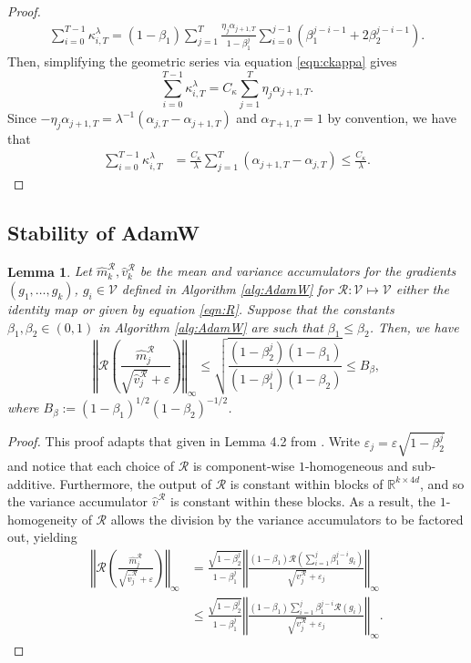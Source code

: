 \documentclass{article}
\newtheorem{lemma}[theorem]{Lemma}
\newcommand{\R}{\mathbb{R}}
\begin{document}
\begin{appendices}
\begin{proof}
\begin{align*}
    \sum_{i=0}^{T-1}\kappa^\lambda_{i,T}= (1-\beta_1)\sum_{j=1}^T\frac{\eta_{j}\alpha_{j+1,T}}{1-\beta_1^j}\sum_{i=0}^{j-1}(\beta_1^{j-i-1}+2\beta_2^{j-i-1}).
\end{align*}
Then, simplifying the geometric series via equation \eqref{eqn:ckappa} gives
\[
\sum_{i=0}^{T-1}\kappa^\lambda_{i,T} = C_\kappa  \sum_{j=1}^T \eta_j\alpha_{j+1,T}.
\]
Since $-\eta_j\alpha_{j+1,T} =\lambda^{-1}(\alpha_{j,T}-\alpha_{j+1,T})$ and $\alpha_{T+1,T}=1$ by convention, we have that
\begin{align*}
    \sum_{i=0}^{T-1}\kappa^\lambda_{i,T}
    & = \frac{C_\kappa}{\lambda}\sum_{j=1}^T (\alpha_{j+1,T}-\alpha_{j,T})\le \frac{C_\kappa}{\lambda}.
\end{align*}
\end{proof}
\subsection{Stability of AdamW}\label{App:K2}
\begin{lemma}\label{lemma:BoundDelta}
Let $\hat m^\mathcal R_k, \hat v^\mathcal R_k$ be the mean and variance accumulators for the gradients $(g_1,\ldots,g_k)$, $g_i \in \mathscr{V}$ defined in Algorithm \ref{alg:AdamW} for $\mathcal R:\mathscr{V}\mapsto \mathscr{V}$ either the identity map or given by equation \eqref{eqn:R}. Suppose that the constants $\beta_1,\beta_2\in (0,1)$ in Algorithm \ref{alg:AdamW} are such that $\beta_1\le \beta_2$. Then, we have
\[
\left\Vert \mathcal R \left(\frac{\hat m^{\mathcal R}_j}{\sqrt{\hat v^{\mathcal R}_j}+\varepsilon} \right)\right\Vert_\infty \le \sqrt{\frac{(1-\beta_2^j)(1-\beta_1)}{(1-\beta_1^j)(1-\beta_2)}}\le B_\beta,
\]  
where $B_\beta:=(1-\beta_1)^{1/2}(1-\beta_2)^{-1/2}$.
\end{lemma}
\begin{proof}\label{proof:BoundUpdtae} This proof adapts that given in Lemma 4.2 from \cite{pmlr-v235-xie24e}. 
Write $\varepsilon_j = \varepsilon \sqrt{1-\beta_2^j}$ and notice that each choice of $\mathcal R$ is component-wise $1$-homogeneous and sub-additive. Furthermore, the output of $\mathcal R$ is constant within blocks of $\R^{k\times 4d}$, and so the variance accumulator $\hat v^\mathcal R$ is constant within these blocks. As a result, the $1$-homogeneity of $\mathcal R$ allows the division by the variance accumulators to be factored out, yielding
\begin{align*}
   \left\Vert \mathcal R\left(\frac{\hat m^\mathcal R_j}{\sqrt{\hat v^\mathcal R_j}+\varepsilon}\right) \right\Vert_\infty &= \frac{\sqrt{1-\beta_2^j}}{1-\beta_1^j} \left\Vert\frac{(1-\beta_1)\mathcal R\left(\sum_{i=1}^j \beta_1^{j-i}g_i\right)}{\sqrt{v^\mathcal R_j}+\varepsilon_j} \right\Vert_\infty\\&\le \frac{\sqrt{1-\beta_2^j}}{1-\beta_1^j} \left\Vert\frac{(1-\beta_1)\sum_{i=1}^j \beta_1^{j-i}\mathcal R\left(g_i\right)}{\sqrt{v^\mathcal R_j}+\varepsilon_j} \right\Vert_\infty.

\end{align*}
\end{proof}
\end{appendices}
\end{document}
